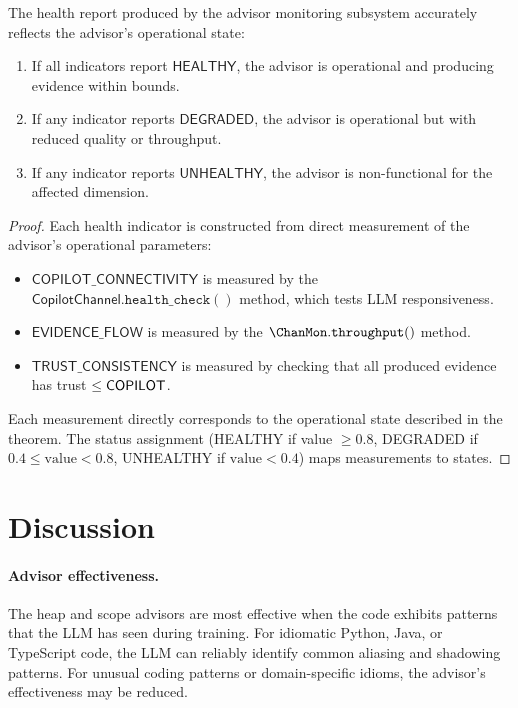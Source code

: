 \documentclass[11pt]{article}
\newcommand{\CopChan}{\mathsf{CopilotChannel}}
\begin{document}
\begin{theorem}
\label{thm:health}
The health report produced by the advisor monitoring subsystem
accurately reflects the advisor's operational state:
\begin{enumerate}
\item If all indicators report $\mathsf{HEALTHY}$, the advisor
  is operational and producing evidence within bounds.
\item If any indicator reports $\mathsf{DEGRADED}$, the advisor
  is operational but with reduced quality or throughput.
\item If any indicator reports $\mathsf{UNHEALTHY}$, the advisor
  is non-functional for the affected dimension.
\end{enumerate}
\end{theorem}

\begin{proof}
Each health indicator is constructed from direct measurement of
the advisor's operational parameters:
\begin{itemize}
\item $\mathsf{COPILOT\_CONNECTIVITY}$ is measured by the
  $\CopChan.\texttt{health\_check}()$ method, which tests LLM
  responsiveness.
\item $\mathsf{EVIDENCE\_FLOW}$ is measured by the
  $\ChanMon.\texttt{throughput}()$ method.
\item $\mathsf{TRUST\_CONSISTENCY}$ is measured by checking
  that all produced evidence has trust $\leq \mathsf{COPILOT}$.
\end{itemize}
Each measurement directly corresponds to the operational state
described in the theorem.  The status assignment (HEALTHY if
value $\geq 0.8$, DEGRADED if $0.4 \leq \mathrm{value} < 0.8$,
UNHEALTHY if $\mathrm{value} < 0.4$) maps measurements to
states.
\end{proof}

\section{Discussion}
\label{sec:discussion}

\paragraph{Advisor effectiveness.}
The heap and scope advisors are most effective when the code
exhibits patterns that the LLM has seen during training.  For
idiomatic Python, Java, or TypeScript code, the LLM can reliably
identify common aliasing and shadowing patterns.  For unusual
coding patterns or domain-specific idioms, the advisor's
effectiveness may be reduced.
\end{document}
